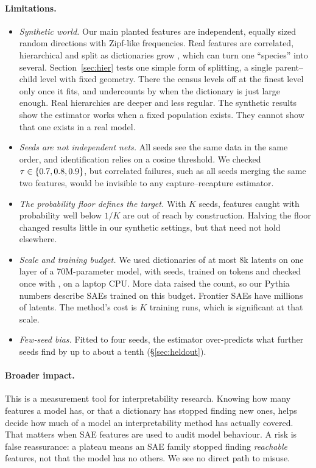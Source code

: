 \paragraph{Limitations.}
\begin{itemize}\setlength\itemsep{1pt}
\item \emph{Synthetic world.} Our main planted features are independent, equally sized random directions with Zipf-like frequencies. Real features are correlated, hierarchical and split as dictionaries grow \citep{bricken2023monosemanticity,leask2025sparse}, which can turn one ``species'' into several. Section~\ref{sec:hier} tests one simple form of splitting, a single parent--child level with fixed geometry. There the census levels off at the finest level only once it fits, and undercounts by \HierSfErrFull{} when the dictionary is just large enough. Real hierarchies are deeper and less regular. The synthetic results show the estimator works when a fixed population exists. They cannot show that one exists in a real model.
\item \emph{Seeds are not independent nets.} All seeds see the same data in the same order, and identification relies on a cosine threshold. We checked $\tau\in\{0.7,0.8,0.9\}$, but correlated failures, such as all seeds merging the same two features, would be invisible to any capture--recapture estimator.
\item \emph{The probability floor defines the target.} With $K$ seeds, features caught with probability well below $1/K$ are out of reach by construction. Halving the floor changed results little in our synthetic settings, but that need not hold elsewhere.
\item \emph{Scale and training budget.} We used dictionaries of at most 8k latents on one layer of a 70M-parameter model, with \RealSeeds{} seeds, trained on \RealTrainTokens{} tokens and checked once with \RealLongTokens{}, on a laptop CPU. More data raised the count, so our Pythia numbers describe SAEs trained on this budget. Frontier SAEs have millions of latents. The method's cost is $K$ training runs, which is significant at that scale.
\item \emph{Few-seed bias.} Fitted to four seeds, the estimator over-predicts what further seeds find by up to about a tenth (\S\ref{sec:heldout}).
\end{itemize}

\paragraph{Broader impact.} This is a measurement tool for interpretability research. Knowing how many features a model has, or that a dictionary has stopped finding new ones, helps decide how much of a model an interpretability method has actually covered. That matters when SAE features are used to audit model behaviour. A risk is false reassurance: a plateau means an SAE family stopped finding \emph{reachable} features, not that the model has no others. We see no direct path to misuse.

